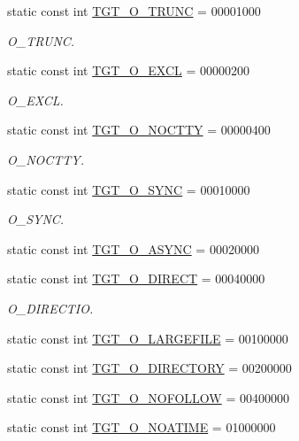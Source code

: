 \begin{DoxyCompactItemize}
static const int \hyperlink{classX86Linux32_a4f892ee6e1424a2becd859b0bef1f18b}{TGT\_\-O\_\-TRUNC} = 00001000
\begin{DoxyCompactList}\small\item\em O\_\-TRUNC. \item\end{DoxyCompactList}\item 
static const int \hyperlink{classX86Linux32_a10d5d118d15b51ebdd4b16dc78342d1d}{TGT\_\-O\_\-EXCL} = 00000200
\begin{DoxyCompactList}\small\item\em O\_\-EXCL. \item\end{DoxyCompactList}\item 
static const int \hyperlink{classX86Linux32_adfd4240281579e5f60c5e22c601225d8}{TGT\_\-O\_\-NOCTTY} = 00000400
\begin{DoxyCompactList}\small\item\em O\_\-NOCTTY. \item\end{DoxyCompactList}\item 
static const int \hyperlink{classX86Linux32_abf43ab05d2a5b6b8113952160d8565db}{TGT\_\-O\_\-SYNC} = 00010000
\begin{DoxyCompactList}\small\item\em O\_\-SYNC. \item\end{DoxyCompactList}\item 
static const int \hyperlink{classX86Linux32_a83565a2a25516c6f6851ab78b9fc6ebe}{TGT\_\-O\_\-ASYNC} = 00020000
\item 
static const int \hyperlink{classX86Linux32_ae5d685a6a2ee8c6fe0ede370f0bec588}{TGT\_\-O\_\-DIRECT} = 00040000
\begin{DoxyCompactList}\small\item\em O\_\-DIRECTIO. \item\end{DoxyCompactList}\item 
static const int \hyperlink{classX86Linux32_a9600e092a6309f94d92129ce5f85b945}{TGT\_\-O\_\-LARGEFILE} = 00100000
\item 
static const int \hyperlink{classX86Linux32_a1f10d158ad65ad6389078ba44629788a}{TGT\_\-O\_\-DIRECTORY} = 00200000
\item 
static const int \hyperlink{classX86Linux32_a9c27f68ab31ddfdd3e35800ea1f02a89}{TGT\_\-O\_\-NOFOLLOW} = 00400000
\item 
static const int \hyperlink{classX86Linux32_a0ee8b0c23c2babc48e978e872b03c82c}{TGT\_\-O\_\-NOATIME} = 01000000

\end{DoxyCompactItemize}
